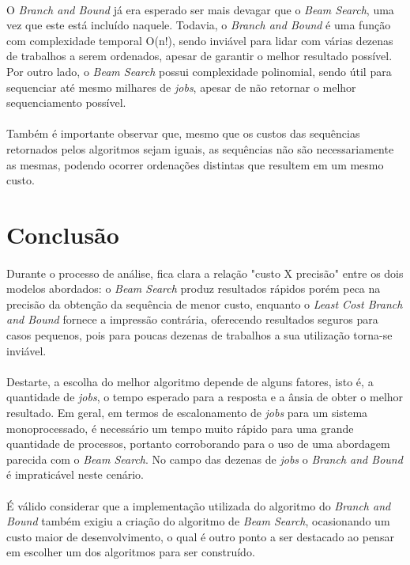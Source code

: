 \documentclass[12pt,a4paper]{article}
\begin{document}
  {\paragraph{} O {\it Branch and Bound} já era esperado ser mais devagar que o {\it Beam Search}, uma vez que este está incluído naquele. Todavia, o {\it Branch and Bound} é uma função com complexidade temporal O(n!), sendo inviável para lidar com várias dezenas de trabalhos a serem ordenados, apesar de garantir o melhor resultado possível. Por outro lado, o {\it Beam Search} possui complexidade polinomial, sendo útil para sequenciar até mesmo milhares de {\it jobs}, apesar de não retornar o melhor sequenciamento possível. }
  {\paragraph{} Também é importante observar que, mesmo que os custos das sequências retornados pelos algoritmos sejam iguais, as sequências não são necessariamente as mesmas, podendo ocorrer ordenações distintas que resultem em um mesmo custo. }
  
 \newpage
 \section{Conclusão}
  {\paragraph{} Durante o processo de análise, fica clara a relação "custo X precisão" entre os dois modelos abordados: o {\it Beam Search} produz resultados rápidos porém peca na precisão da obtenção da sequência de menor custo, enquanto o {\it Least Cost Branch and Bound} fornece a impressão contrária, oferecendo resultados seguros para casos pequenos, pois para poucas dezenas de trabalhos a sua utilização torna-se inviável. }
  {\paragraph{} Destarte, a escolha do melhor algoritmo depende de alguns fatores, isto é, a quantidade de {\it jobs}, o tempo esperado para a resposta e a ânsia de obter o melhor resultado. Em geral, em termos de escalonamento de {\it jobs} para um sistema monoprocessado, é necessário um tempo muito rápido para uma grande quantidade de processos, portanto corroborando para o uso de uma abordagem parecida com o {\it Beam Search}. No campo das dezenas de {\it jobs} o {\it Branch and Bound} é impraticável neste cenário. }
  {\paragraph{} É válido considerar que a implementação utilizada do algoritmo do {\it Branch and Bound} também exigiu a criação do algoritmo de {\it Beam Search}, ocasionando um custo maior de desenvolvimento, o qual é outro ponto a ser destacado ao pensar em escolher um dos algoritmos para ser construído. }
 
\end{document}
